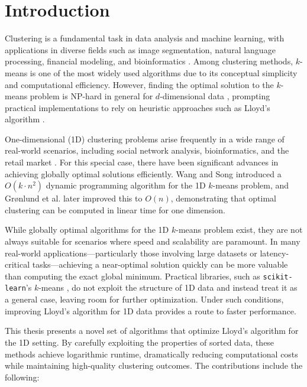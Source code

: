 \chapter{Introduction}\label{chap:introduction}

Clustering is a fundamental task in data analysis and machine learning, with applications in diverse fields such as image segmentation, natural language processing, financial modeling, and bioinformatics \cite{Xu2005Survey}. Among clustering methods, $k$-means \cite{MacQueen1967} is one of the most widely used algorithms due to its conceptual simplicity and computational efficiency. However, finding the optimal solution to the $k$-means problem is NP-hard in general for \(d\)-dimensional data \cite{nphard}, prompting practical implementations to rely on heuristic approaches such as Lloyd’s algorithm \cite{lloyd,max}.

One-dimensional (1D) clustering problems arise frequently in a wide range of real-world scenarios, including social network analysis, bioinformatics, and the retail market \cite{Arnaboldi_2016,genomemining,retail}. For this special case, there have been significant advances in achieving globally optimal solutions efficiently. Wang and Song \cite{wang1ddp} introduced a \(O(k \cdot n^2)\) dynamic programming algorithm for the 1D $k$-means problem, and Grønlund et al. \cite{fastexactkmeans} later improved this to \(O(n)\), demonstrating that optimal clustering can be computed in linear time for one dimension.

While globally optimal algorithms for the 1D $k$-means problem exist, they are not always suitable for scenarios where speed and scalability are paramount. In many real-world applications—particularly those involving large datasets or latency-critical tasks—achieving a near-optimal solution quickly can be more valuable than computing the exact global minimum. Practical libraries, such as \texttt{scikit-learn}'s $k$-means \cite{sklearn}, do not exploit the structure of 1D data and instead treat it as a general case, leaving room for further optimization. Under such conditions, improving Lloyd’s algorithm for 1D data provides a route to faster performance.

This thesis presents a novel set of algorithms that optimize Lloyd’s algorithm for the 1D setting. By carefully exploiting the properties of sorted data, these methods achieve logarithmic runtime, dramatically reducing computational costs while maintaining high-quality clustering outcomes. The contributions include the following:


